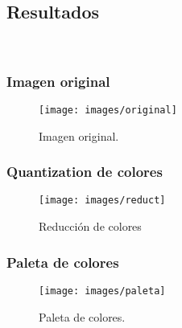 \subsection{Resultados}
\\
\subsubsection{Imagen original}
\begin{figure}[H]
  \centering
  \texttt{[image: images/original]}
  \caption{Imagen original.}
  \label{fig:act-4}
\end{figure}
\subsubsection{Quantization de colores}
\begin{figure}[H]
  \centering
  \texttt{[image: images/reduct]}
  \caption{Reducción de colores}
  \label{fig:act-4}
\end{figure}
\subsubsection{Paleta de colores}
\begin{figure}[H]
  \centering
  \texttt{[image: images/paleta]}
  \caption{Paleta de colores.}
  \label{fig:act-4}
\end{figure}

